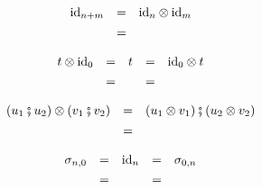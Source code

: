 \documentclass[12pt, a4paper]{article}
\newcommand{\tinyinput}[1]{\scalebox{0.44}{}}
\def\id{ \mathrm{id} }
\begin{document}
\begin{figure}[h]
{\begin{minipage}{0.982\linewidth}
\begin{center}
        \vspace{-0.5em}
        \begin{subfigure}{0.30\textwidth}
            \begin{equation}\label{eq:idinduct}
                \begin{array}{ccc}
                    \id_{n+m}&=&\id_{n}\otimes\id_{m}\\[.4em]
                    \tinyinput{fig/idpar_left.tikz}&=&\tinyinput{fig/idpar_right.tikz}
                \end{array}
            \end{equation}
        \end{subfigure}\hspace{2em}
        \begin{subfigure}{0.40\textwidth}
            \begin{equation}\label{eq:paridentity}
                \begin{array}{ccccc}
                    t\otimes \id_0&=&t&=&\id_0\otimes t\\[.4em]
                    \tinyinput{fig/parid_left.tikz}&=&\tinyinput{fig/parid_mid.tikz}&=&\tinyinput{fig/parid_right.tikz}
                \end{array}
            \end{equation}
        \end{subfigure}

        \vspace{-0.5em}
        \begin{subfigure}{0.57\textwidth}
            \begin{equation}\label{eq:interchange}
                \begin{array}{ccc}
                    (u_1\fatsemi u_2)\otimes(v_1\fatsemi v_2)&=&(u_1\otimes v_1)\fatsemi(u_2\otimes v_2)\\[.4em]
                    \tinyinput{fig/interchange_left.tikz}&=&\tinyinput{fig/interchange_right.tikz}
                \end{array}
            \end{equation}
        \end{subfigure}\hspace{1em}
        \begin{subfigure}{0.36\textwidth}
            \begin{equation}\label{eq:emptysymmetry}
                \begin{array}{ccccc}
                    \sigma_{n,0}&=&\id_n&=&\sigma_{0,n}\\[.4em]
                    \tinyinput{fig/s0_left.tikz}&=&\tinyinput{fig/s0_mid.tikz}&=&\tinyinput{fig/s0_right.tikz}
                \end{array}
            \end{equation}
        \end{subfigure}


\end{center}
\end{minipage}}
\end{figure}
\end{document}
